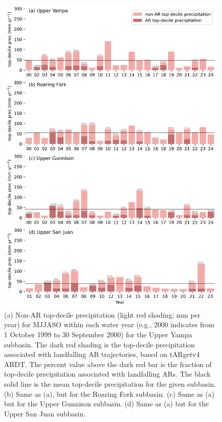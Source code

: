 \documentclass[draft,jgrga]{agutexSI2019}
\begin{document}
\begin{article}
\begin{figure}
\noindent\includegraphics[scale=0.65]{figS13.png}
\caption{(a) Non-AR top-decile precipitation (light red shading; mm per year) for MJJASO within each water year (e.g., 2000 indicates from 1 October 1999 to 30 September 2000) for the Upper Yampa subbasin. The dark red shading is the top-decile precipitation associated with landfalling AR trajectories, based on tARgetv4 ARDT. The percent value above the dark red bar is the fraction of top-decile precipitation associated with landfalling ARs. The black solid line is the mean top-decile precipitation for the given subbasin. (b) Same as (a), but for the Roaring Fork subbasin. (c) Same as (a) but for the Upper Gunnison subbasin. (d) Same as (a) but for the Upper San Juan subbasin.}
\label{fig:supp:time_series_MJJASO}
\end{figure}


\end{article}
\end{document}
